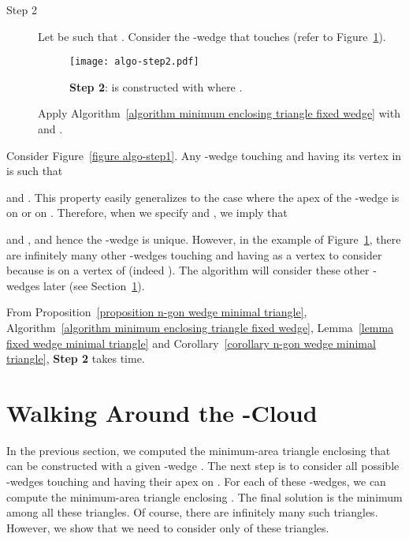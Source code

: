 \documentclass[11pt, oneside]{article}
\begin{document}
\begin{description}
\item[Step 2] Let  be such that .
Consider the -wedge  
that touches 
(refer to Figure~\ref{figure algo-step2}).
\begin{figure}
\centering
\texttt{[image: algo-step2.pdf]}
\caption{{\bf Step 2}: 
 is constructed with 
where .\label{figure algo-step2}}
\end{figure}
Apply Algorithm~\ref{algorithm minimum enclosing triangle fixed wedge}
with  and .
\end{description}

Consider Figure~\ref{figure algo-step1}.
Any -wedge touching  
and having its vertex in 
is such that 

and .
This property easily generalizes to the case 
where the apex of the -wedge is on  or on .
Therefore,
when we specify  and ,
we imply that

and ,
and hence the -wedge is unique.
However,
in the example of Figure~\ref{figure algo-step2},
there are infinitely many other -wedges touching 
and having  as a vertex to consider
because  is on a vertex of 
(indeed ).
The algorithm will consider these other -wedges later
(see Section~\ref{section walking around omega cloud}).

From Proposition~\ref{proposition n-gon wedge minimal triangle},
Algorithm~\ref{algorithm minimum enclosing triangle fixed wedge},
Lemma~\ref{lemma fixed wedge minimal triangle}
and Corollary~\ref{corollary n-gon wedge minimal triangle},
{\bf Step 2} takes  time.




\section{Walking Around the -Cloud}
\label{section walking around omega cloud}




In the previous section,
we computed the minimum-area triangle
enclosing 
that can be constructed with a given -wedge
.
The next step is to consider
all possible -wedges touching 
and having their apex on .
For each of these -wedges,
we can compute the minimum-area triangle enclosing .
The final solution is the minimum among all these triangles.
Of course,
there are infinitely many such triangles.
However,
we show that we need to consider 
only  of these triangles.
\end{document}
